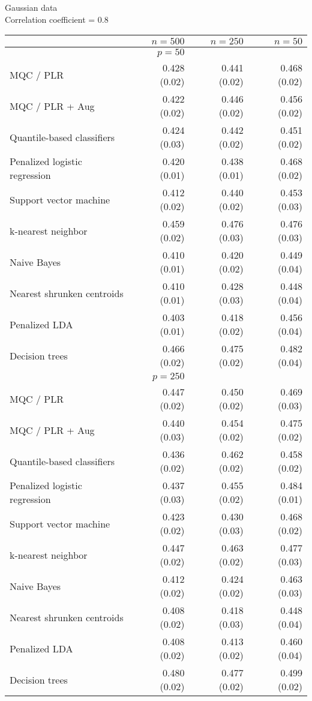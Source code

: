 \begin{table}[p]
  \centering
  Gaussian data \\
  Correlation coefficient = 0.8 \\[2ex]
  \begin{adjustbox}{max size={\textwidth}{10cm}}
    \begin{tabular}{l@{\extracolsep{15mm}}rrr}
      
      \hline
      & $n=500$ & $n=250$ & $n=50$ \\ 
      \hline
      & $p = 50$ \\
      \hline

      MQC / PLR & 0.428 (0.02) & 0.441 (0.02) & 0.468 (0.02) \\ 
      MQC / PLR + Aug & 0.422 (0.02) & 0.446 (0.02) & 0.456 (0.02) \\ 
      Quantile-based classifiers & 0.424 (0.03) & 0.442 (0.02) & 0.451 (0.02) \\ 
      Penalized logistic regression & 0.420 (0.01) & 0.438 (0.01) & 0.468 (0.02) \\ 
      Support vector machine & 0.412 (0.02) & 0.440 (0.02) & 0.453 (0.03) \\ 
      k-nearest neighbor & 0.459 (0.02) & 0.476 (0.03) & 0.476 (0.03) \\ 
      Naive Bayes & 0.410 (0.01) & 0.420 (0.02) & 0.449 (0.04) \\ 
      Nearest shrunken centroids & 0.410 (0.01) & 0.428 (0.03) & 0.448 (0.04) \\ 
      Penalized LDA & 0.403 (0.01) & 0.418 (0.02) & 0.456 (0.04) \\ 
      Decision trees & 0.466 (0.02) & 0.475 (0.02) & 0.482 (0.04) \\ [2ex]

      \hline
      & $p = 250$ \\
      \hline

      MQC / PLR & 0.447 (0.02) & 0.450 (0.02) & 0.469 (0.03) \\ 
      MQC / PLR + Aug & 0.440 (0.03) & 0.454 (0.02) & 0.475 (0.02) \\ 
      Quantile-based classifiers & 0.436 (0.02) & 0.462 (0.02) & 0.458 (0.02) \\ 
      Penalized logistic regression & 0.437 (0.03) & 0.455 (0.02) & 0.484 (0.01) \\ 
      Support vector machine & 0.423 (0.02) & 0.430 (0.03) & 0.468 (0.02) \\ 
      k-nearest neighbor & 0.447 (0.02) & 0.463 (0.02) & 0.477 (0.03) \\ 
      Naive Bayes & 0.412 (0.02) & 0.424 (0.02) & 0.463 (0.03) \\ 
      Nearest shrunken centroids & 0.408 (0.02) & 0.418 (0.03) & 0.448 (0.04) \\ 
      Penalized LDA & 0.408 (0.02) & 0.413 (0.02) & 0.460 (0.04) \\ 
      Decision trees & 0.480 (0.02) & 0.477 (0.02) & 0.499 (0.02) \\ [2ex]


\end{tabular}
\end{adjustbox}
\end{table}
